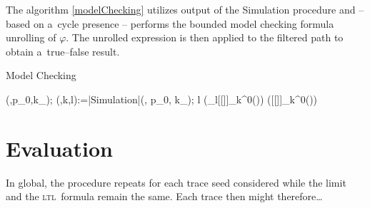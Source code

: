 \documentclass[12pt,oneside,draft]{fithesis}
\newcommand{\ltl}{\textsc{ltl}~}
\begin{document}
The algorithm \ref{modelChecking} utilizes output of the Simulation
procedure and -- based on a~cycle presence -- performs the bounded
model checking formula unrolling of $\varphi$. The unrolled expression
is then applied to the filtered path to obtain a~true--false result.


\begin{algorithm}
	\caption{Model Checking}
	\label{modelChecking}
	\begin{program}
		\:(\varphi,p_0,k_\omega);
		\BEGIN
			(\tilde{\pi},k,l):=|Simulation|(\varphi, p_0, k_\omega);
			\IF l 
			\THEN
				({}_l[[\varphi]]_k^0(\tilde{\pi})) 
			\ELSE
				([[\varphi]]_k^0(\tilde{\pi})) 
			\FI
		\END
	\end{program}
\end{algorithm}

\chapter{Evaluation}
In global, the procedure repeats for each trace seed considered while
the limit and the \ltl formula remain the same. Each trace then might
therefore\dots


\end{document}
